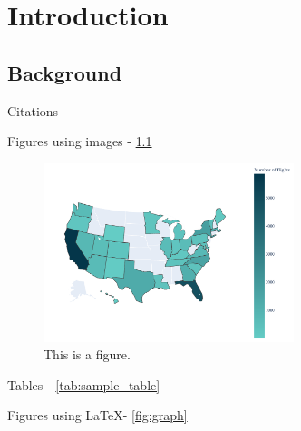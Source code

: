 \chapter{Introduction}{\label{ch:intro}}
\section{Background}

\lipsum[3]

Citations - \cite{Ramesh2020}

Figures using images - \ref{fig:my_label}

\begin{figure}[!ht]
    \centering
    \includegraphics[width=0.65\textwidth]{figs/sample_image.pdf}
    \caption{This is a figure.}
    \label{fig:my_label}
\end{figure}




Tables - \ref{tab:sample_table}

Figures using \LaTeX - \ref{fig:graph}

